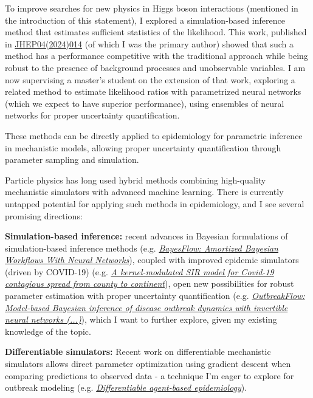 \documentclass[11pt, a4paper]{awesome-cv}
\begin{document}
\begin{cvletter}
To improve searches for new physics in Higgs boson interactions (mentioned in the introduction of this statement), I explored a simulation-based inference method that estimates sufficient statistics of the likelihood. This work, published in \href{http://dx.doi.org/10.1007/JHEP04(2024)014}{JHEP04(2024)014} (of which I was the primary author) showed that such a method has a performance competitive with the traditional approach while being robust to the presence of background processes and unobservable variables. I am now supervising a master's student on the extension of that work, exploring a related method to estimate likelihood ratios with parametrized neural networks (which we expect to have superior performance), using ensembles of neural networks for proper uncertainty quantification. 

These methods can be directly applied to epidemiology for parametric inference in mechanistic models, allowing proper uncertainty quantification through parameter sampling and simulation.


Particle physics has long used hybrid methods combining high-quality mechanistic simulators with advanced machine learning. There is currently untapped potential for applying such methods in epidemiology, and I see several promising directions:

\textbf{Simulation-based inference:} recent advances in Bayesian formulations of simulation-based inference methods (e.g. \href{https://arxiv.org/abs/2306.16015}{\textit{BayesFlow: Amortized Bayesian Workflows With Neural Networks}}), coupled with improved epidemic simulators (driven by COVID-19) (e.g. \href{https://pubmed.ncbi.nlm.nih.gov/33958443/}{\textit{A kernel-modulated SIR model for Covid-19 contagious spread from county to continent}}), open new possibilities for robust parameter estimation with proper uncertainty quantification (e.g. \href{https://journals.plos.org/ploscompbiol/article?id=10.1371/journal.pcbi.1009472}{\textit{OutbreakFlow: Model-based Bayesian inference of disease outbreak dynamics with invertible neural networks (...)}}), which I want to further explore, given my existing knowledge of the topic.
  
\textbf{Differentiable simulators:} Recent work on differentiable mechanistic simulators allows direct parameter optimization using gradient descent when comparing predictions to observed data - a technique I'm eager to explore for outbreak modeling (e.g. \href{https://dl.acm.org/doi/abs/10.5555/3545946.3598851}{\textit{Differentiable agent-based epidemiology}}).


\end{cvletter}
\end{document}
